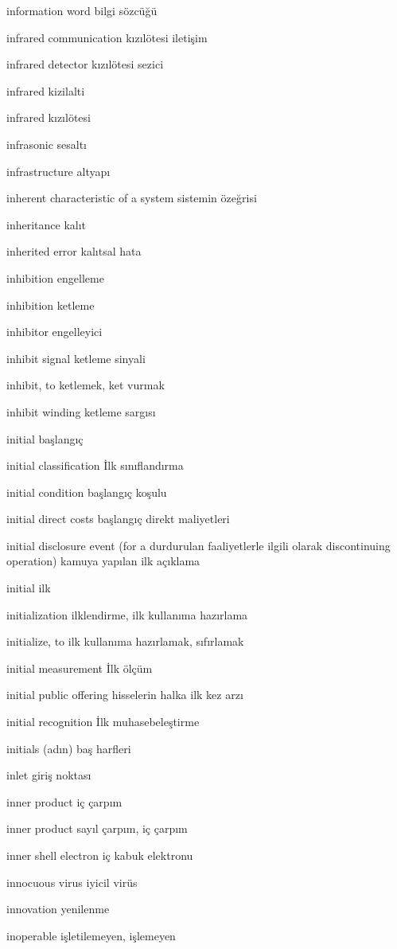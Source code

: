 \documentclass[12pt,fleqn]{article}\usepackage{../../common}
\begin{document}
information word bilgi sözcüğü

infrared communication kızılötesi iletişim

infrared detector kızılötesi sezici

infrared kizilalti

infrared kızılötesi

infrasonic sesaltı

infrastructure altyapı

inherent characteristic of a system sistemin özeğrisi

inheritance kalıt

inherited error kalıtsal hata

inhibition engelleme

inhibition ketleme

inhibitor engelleyici

inhibit signal ketleme sinyali

inhibit, to ketlemek, ket vurmak

inhibit winding ketleme sargısı

initial başlangıç

initial classification İlk sınıflandırma

initial condition başlangıç koşulu

initial direct costs başlangıç direkt maliyetleri

initial disclosure event (for a durdurulan faaliyetlerle ilgili olarak discontinuing operation) kamuya yapılan ilk açıklama

initial ilk

initialization ilklendirme, ilk kullanıma hazırlama

initialize, to ilk kullanıma hazırlamak, sıfırlamak

initial measurement İlk ölçüm

initial public offering hisselerin halka ilk kez arzı

initial recognition İlk muhasebeleştirme

initials (adın) baş harfleri

inlet giriş noktası

inner product iç çarpım

inner product sayıl çarpım, iç çarpım

inner shell electron iç kabuk elektronu

innocuous virus iyicil virüs

innovation yenilenme

inoperable işletilemeyen, işlemeyen
\end{document}
